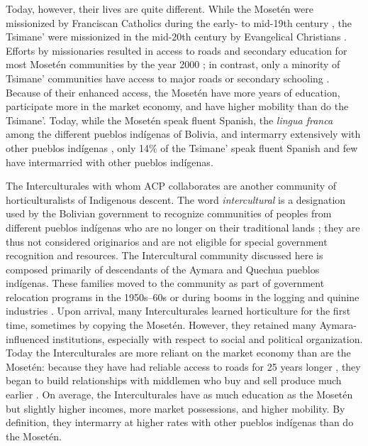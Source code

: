 \documentclass[bibauthoryear]{aa}
\begin{document}
Today, however, their lives are quite different. While the Moset\'en were missionized by Franciscan Catholics during the early- to mid-19th century \citep{godoy2015natural, mamani2010tsinsi, ref947717999}, the Tsimane' were missionized in the mid-20th century by Evangelical Christians \citep{tomas2008tsimane}. Efforts by missionaries resulted in access to roads and secondary education for most Moset\'en communities by the year 2000 \citep{pisor2018diversify}; in contrast,  only a minority of Tsimane' communities have access to major roads or secondary schooling \citep{ringhofer2010exploring}. 
Because of their enhanced access, the Moset\'en have more years of education, participate more in the market economy, and have higher mobility than do the Tsimane'. Today, while the Moset\'en speak fluent Spanish, the \textit{lingua franca} among the different pueblos ind\'igenas of Bolivia, and intermarry extensively with other pueblos ind\'igenas \citep{pisor2018diversify}, only 14\% of the Tsimane' speak fluent Spanish \citep{pisor2016risk} and few have intermarried with other pueblos ind\'igenas.

The Interculturales with whom ACP collaborates are another community of horticulturalists of Indigenous descent. The word \textit{intercultural} is a designation used by the Bolivian government to recognize communities of peoples from different pueblos ind\'igenas who are no longer on their traditional lands \citep{albo2007bolivia}; they are thus not considered originarios and are not eligible for special government recognition and resources. The Intercultural community discussed here is composed primarily of descendants of the Aymara and Quechua pueblos ind\'igenas. These families moved to the community as part of government relocation programs in the 1950s--60s or during booms in the logging and quinine industries  \citep{pisor2016risk, pisor2018diversify}. Upon arrival, many Interculturales learned horticulture for the first time, sometimes by copying the Moset\'en. However, they retained many Aymara-influenced institutions, especially with respect to social and political organization. Today the Interculturales are more reliant on the market economy than are the Moset\'en: because they have had reliable access to roads for 25 years longer \citep{Llojlla2011}, they began to build relationships with middlemen who buy and sell produce much earlier \citep{pisorjones2020}. On average, the Interculturales have as much education as the Moset\'en but slightly higher incomes, more market possessions, and higher mobility. By definition, they intermarry at higher rates with other pueblos ind\'igenas than do the Moset\'en.
		  
\end{document}
